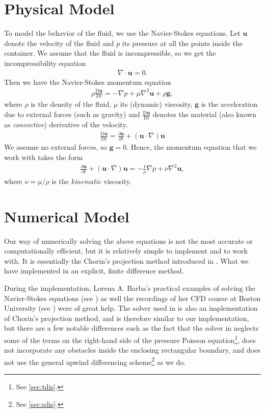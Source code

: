 \documentclass[11pt,a4paper,twoside,openright]{report}
\begin{document}
\section{Physical Model}
To model the behavior of the fluid, we use the Navier-Stokes equations. Let $\mathbf u$ denote the velocity of the fluid and $p$ its pressure at all the points inside the container. We assume that the fluid is incompressible, so we get the incompressibility equation
\newcommand{\uu}{\mathbf u}
\newcommand{\D}{\mathrm D}
\begin{align}\label{eq:incom}
	\nabla\cdot\uu=0.
\end{align}
Then we have the Navier-Stokes momentum equation
\newcommand{\conv}{\frac{\D\uu}{\D t}}
\begin{align*}
	\rho\conv=-\nabla p+\mu\nabla^2\uu+\rho\mathbf g,
\end{align*}
where $\rho$ is the density of the fluid, $\mu$ its (dynamic) viscosity, $\mathbf g$ is the acceleration due to external forces (such as gravity) and $\conv$ denotes the material (also known as \emph{convective}) derivative of the velocity.
\newcommand{\pder}[2]{\frac{\partial #1}{\partial #2}}
\begin{align*}
	\conv=\pder\uu t+(\uu\cdot\nabla)\uu
\end{align*}
We assume no external forces, so $\mathbf g=0$. Hence, the momentum equation that we work with takes the form
\begin{align}\label{eq:momentum}
	\pder\uu t+(\uu\cdot\nabla)\uu=-\frac1\rho\nabla p+\nu\nabla^2\uu,
\end{align}
where $\nu=\mu/\rho$ is the \emph{kinematic} viscosity.
\section{Numerical Model}
Our way of numerically solving the above equations is not the most accurate or computationally efficient, but it is relatively simple to implement and to work with. It is essentially the Chorin's projection method introduced in \cite{Chorin}. What we have implemented in an explicit, finite difference method.

During the implementation, Lorena A. Barba's practical examples of solving the Navier-Stokes equations (see \cite{CFDpython}) as well the recordings of her CFD course at Boston University (see \cite{BarbaCourse}) were of great help. The solver used in \cite{CFDpython} is also an implementation of Chorin's projection method, and is therefore similar to our implementation, but there are a few notable differences such as the fact that the solver in \cite{CFDpython} neglects some of the terms on the right-hand side of the pressure Poisson equation\footnote{See \ref{sec:tdis}.}, does not incorporate any obstacles inside the enclosing rectangular boundary, and does not use the general upwind differencing scheme\footnote{See \ref{sec:sdis}.} as we do.
\end{document}
